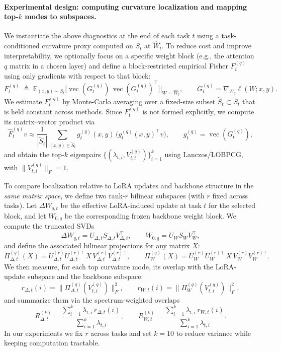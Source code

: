 \documentclass{article}
\theoremstyle{plain}
\theoremstyle{definition}
\theoremstyle{remark}
\begin{document}
\paragraph{Experimental design: computing curvature localization and mapping top-$k$ modes to subspaces.}
We instantiate the above diagnostics at the end of each task $t$ using a task-conditioned curvature proxy computed on $S_t$ at $\hat W_t$. To reduce cost and improve interpretability, we optionally focus on a specific weight block (e.g., the attention $q$ matrix in a chosen layer) and define a block-restricted empirical Fisher $F_t^{(q)}$ using only gradients with respect to that block:
$$
F_t^{(q)} \;\triangleq\; \mathbb E_{(x,y)\sim S_t}\Big[\operatorname{vec}(G_{t}^{(q)})\,\operatorname{vec}(G_{t}^{(q)})^\top\Big]\Big|_{W=\hat W_t},
\qquad
G_{t}^{(q)}=\nabla_{W_q}\ell(W;x,y).
$$
We estimate $F_t^{(q)}$ by Monte-Carlo averaging over a fixed-size subset $\tilde S_t\subset S_t$ that is held constant across methods. Since $F_t^{(q)}$ is not formed explicitly, we compute its matrix--vector product via
$$
\widehat F_t^{(q)}v
\approx
\frac{1}{|\tilde S_t|}\sum_{(x,y)\in \tilde S_t}
g_{t}^{(q)}(x,y)\,\big(g_{t}^{(q)}(x,y)^\top v\big),
\qquad
g_{t}^{(q)}=\operatorname{vec}(G_{t}^{(q)}),
$$
and obtain the top-$k$ eigenpairs $\{(\lambda_{t,i},V_{t,i}^{(q)})\}_{i=1}^{k}$ using Lanczos/LOBPCG, with $\|V_{t,i}^{(q)}\|_F=1$.

To compare localization relative to LoRA updates and backbone structure in the \emph{same matrix space}, we define two rank-$r$ bilinear subspaces (with $r$ fixed across tasks). Let $\Delta W_{q,t}$ be the effective LoRA-induced update at task $t$ for the selected block, and let $W_{0,q}$ be the corresponding frozen backbone weight block. We compute the truncated SVDs
$$
\Delta W_{q,t}=U_{\Delta,t}S_{\Delta,t}V_{\Delta,t}^\top,
\qquad
W_{0,q}=U_WS_WV_W^\top,
$$
and define the associated bilinear projections for any matrix $X$:
$$
\Pi_{\Delta,t}^{(q)}(X)=U_{\Delta,t}^{(r)}U_{\Delta,t}^{(r)\top}\,X\,V_{\Delta,t}^{(r)}V_{\Delta,t}^{(r)\top},
\qquad
\Pi_{W}^{(q)}(X)=U_{W}^{(r)}U_{W}^{(r)\top}\,X\,V_{W}^{(r)}V_{W}^{(r)\top}.
$$
We then measure, for each top curvature mode, its overlap with the LoRA-update subspace and the backbone subspace:
$$
r_{\Delta,t}(i)=\|\Pi_{\Delta,t}^{(q)}(V_{t,i}^{(q)})\|_F^2,
\qquad
r_{W,t}(i)=\|\Pi_{W}^{(q)}(V_{t,i}^{(q)})\|_F^2,
$$
and summarize them via the spectrum-weighted overlaps
$$
R_{\Delta,t}^{(k)}=
\frac{\sum_{i=1}^{k}\lambda_{t,i}\,r_{\Delta,t}(i)}{\sum_{i=1}^{k}\lambda_{t,i}},
\qquad
R_{W,t}^{(k)}=
\frac{\sum_{i=1}^{k}\lambda_{t,i}\,r_{W,t}(i)}{\sum_{i=1}^{k}\lambda_{t,i}}.
$$
In our experiments we fix $r$ across tasks and set $k=10$ to reduce variance while keeping computation tractable.
\end{document}
